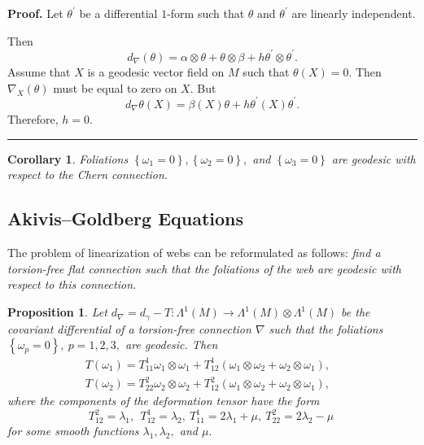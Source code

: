 \documentclass{article}
\newtheorem{corollary}[theorem]{Corollary}
\newtheorem{proposition}[theorem]{Proposition}
\newenvironment{proof}[1][Proof]{\noindent\textbf{#1.} }{\ \rule{0.5em}{0.5em}}
\begin{document}
\begin{proof}
Let $\theta ^{\prime }$ be a differential $1$-form such that $\theta $ and $%
\theta ^{\prime }$ are linearly independent.

Then
\begin{equation*}
d_{\nabla }\left( \theta \right) =\alpha \otimes \theta +\theta \otimes
\beta +h\theta ^{\prime }\otimes \theta ^{\prime }.
\end{equation*}%
Assume that $X$ is a geodesic vector field on $M$ such that $\theta \left(
X\right) =0.$ Then $\nabla _{X}\left( \theta \right) $ must be equal to zero
on $X.$ But
\begin{equation*}
d_{\nabla }\theta \left( X\right) =\beta \left( X\right) \theta +h\theta
^{\prime }\left( X\right) \theta ^{\prime }.
\end{equation*}%
Therefore, $h=0.$
\end{proof}

\begin{corollary}
Foliations $\left\{ \omega _{1}=0\right\} ,\left\{ \omega _{2}=0\right\} ,$
and $\left\{ \omega _{3}=0\right\} $ are geodesic with respect to the Chern
connection.
\end{corollary}

\subsection{Akivis--Goldberg Equations}

The problem of linearization of webs can be reformulated as follows: \emph{%
find a torsion-free flat connection such that the foliations of the web are
geodesic with respect to this connection.}

\begin{proposition}
Let $d_{\nabla }=d_{\gamma }-T:\Lambda ^{1}\left( M\right) \rightarrow
\Lambda ^{1}\left( M\right) \otimes \Lambda ^{1}\left( M\right) $ be the
covariant differential of a torsion-free connection $\nabla $ such that the
foliations $\left\{ \omega _{p}=0\right\} ,\ p=1,2,3,$ are geodesic. Then
\begin{equation}
\begin{array}{ll}
T\left( \omega _{1}\right) =T_{11}^{1}\omega _{1}\otimes \omega
_{1}+T_{12}^{1}\left( \omega _{1}\otimes \omega _{2}+\omega _{2}\otimes
\omega _{1}\right) , &  \\
T\left( \omega _{2}\right) =T_{22}^{2}\omega _{2}\otimes \omega
_{2}+T_{12}^{2}\left( \omega _{1}\otimes \omega _{2}+\omega _{2}\otimes
\omega _{1}\right) \label{defTensor general}, &
\end{array}%
\end{equation}%
where the components of the deformation tensor have the form
\begin{equation}
T_{12}^{2}=\lambda _{1},\ \ T_{12}^{1}=\lambda _{2},\ T_{11}^{1}=2\lambda
_{1}+\mu ,\ T_{22}^{2}=2\lambda _{2}-\mu \   \label{Deformation tensor}
\end{equation}%
for some smooth functions $\lambda _{1},\lambda _{2},$ and $\mu .$
\end{proposition}
\end{document}
